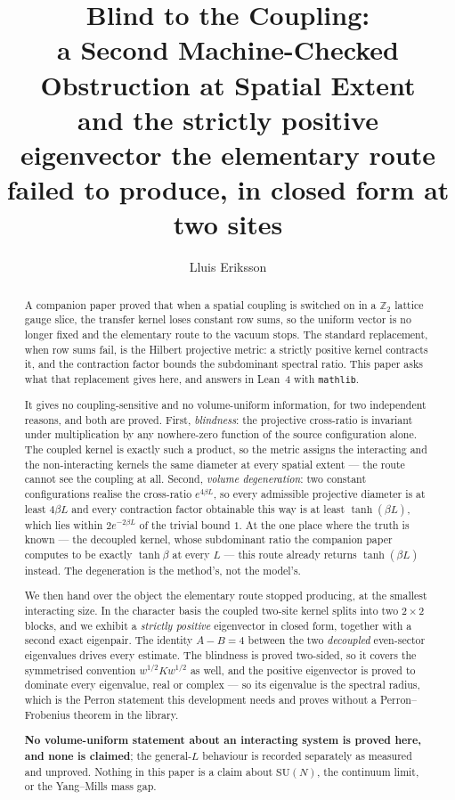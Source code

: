 \documentclass[11pt]{article}
\title{Blind to the Coupling:\\
a Second Machine-Checked Obstruction at Spatial Extent\\
\large and the strictly positive eigenvector the elementary route failed to
produce, in closed form at two sites}
\author{Lluis Eriksson}
\date{}
\theoremstyle{definition}
\newcommand{\Z}{\mathbb{Z}}
\newcommand{\SU}{\mathrm{SU}}
\begin{document}
\maketitle

\begin{abstract}
A companion paper proved that when a spatial coupling is switched on in a
$\Z_2$ lattice gauge slice, the transfer kernel loses constant row sums, so the
uniform vector is no longer fixed and the elementary route to the vacuum
stops.  The standard replacement, when row sums fail, is the Hilbert projective
metric: a strictly positive kernel contracts it, and the contraction factor
bounds the subdominant spectral ratio.  This paper asks what that replacement
gives here, and answers in Lean~4 with \texttt{mathlib}.

It gives no coupling-sensitive and no volume-uniform information, for two
independent reasons, and both are proved.  First,
\emph{blindness}: the projective cross-ratio is invariant under multiplication
by any nowhere-zero function of the source configuration alone.  The coupled
kernel is exactly such a product, so the metric assigns the interacting and the
non-interacting kernels the same diameter at every spatial extent --- the route
cannot see the coupling at all.  Second, \emph{volume degeneration}: two
constant configurations realise the cross-ratio $e^{4\beta L}$, so every
admissible projective diameter is at least $4\beta L$ and every contraction
factor obtainable this way is at least $\tanh(\beta L)$, which lies within
$2e^{-2\beta L}$ of the trivial bound $1$.  At the one place where the truth is
known --- the decoupled kernel, whose subdominant ratio the companion paper
computes to be exactly $\tanh\beta$ at every $L$ --- this route already returns
$\tanh(\beta L)$ instead.  The degeneration is the method's, not the model's.

We then hand over the object the elementary route stopped producing, at the
smallest interacting size.  In the character basis the coupled two-site kernel
splits into two $2\times2$ blocks, and we exhibit a \emph{strictly positive}
eigenvector in closed form, together with a second exact eigenpair.  The
identity $A-B=4$ between the two \emph{decoupled} even-sector eigenvalues drives
every estimate.  The blindness is proved two-sided, so it covers the symmetrised
convention $w^{1/2}Kw^{1/2}$ as well, and the positive eigenvector is proved to
dominate every eigenvalue, real or complex --- so its eigenvalue is the spectral
radius, which is the Perron statement this development needs and proves without
a Perron--Frobenius theorem in the library.

\textbf{No volume-uniform statement about an interacting system is proved here,
and none is claimed}; the general-$L$ behaviour is recorded separately as
measured and unproved.  Nothing in this paper is a claim about $\SU(N)$, the
continuum limit, or the Yang--Mills mass gap.
\end{abstract}
\end{document}
